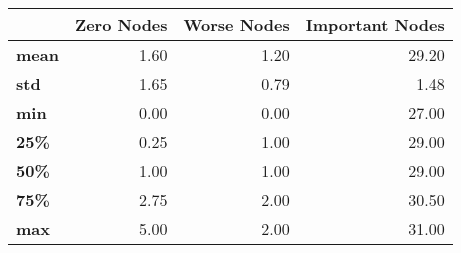 \begin{tabular}{lrrr}
\toprule
{} &  Zero Nodes &  Worse Nodes &  Important Nodes \\
\midrule
\textbf{mean} &        1.60 &         1.20 &            29.20 \\
\textbf{std } &        1.65 &         0.79 &             1.48 \\
\textbf{min } &        0.00 &         0.00 &            27.00 \\
\textbf{25\% } &        0.25 &         1.00 &            29.00 \\
\textbf{50\% } &        1.00 &         1.00 &            29.00 \\
\textbf{75\% } &        2.75 &         2.00 &            30.50 \\
\textbf{max } &        5.00 &         2.00 &            31.00 \\
\bottomrule
\end{tabular}

